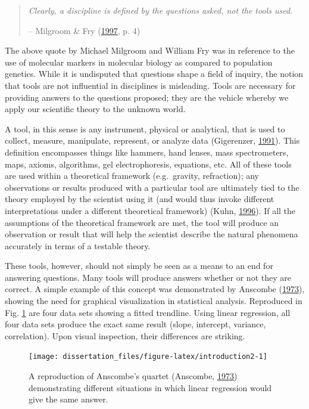 \documentclass[double,11pt]{beavtex}
\begin{document}
  \begin{quote}
  \emph{Clearly, a discipline is defined by the questions asked, not the
  tools used.}
  
  -- Milgroom \& Fry
  (\protect\hyperlink{ref-milgroom1997contributions}{1997}, p. 4)
  \end{quote}
  
  The above quote by Michael Milgroom and William Fry was in reference to
  the use of molecular markers in molecular biology as compared to
  population genetics. While it is undisputed that questions shape a field
  of inquiry, the notion that tools are not influential in disciplines is
  misleading. Tools are necessary for providing answers to the questions
  proposed; they are the vehicle whereby we apply our scientific theory to
  the unknown world.
  
  A tool, in this sense is any instrument, physical or analytical, that is
  used to collect, measure, manipulate, represent, or analyze data
  (Gigerenzer, \protect\hyperlink{ref-gigerenzer1991tools}{1991}). This
  definition encompasses things like hammers, hand lenses, mass
  spectrometers, maps, axioms, algorithms, gel electrophoresis, equations,
  etc. All of these tools are used within a theoretical framework
  (e.g.~gravity, refraction); any observations or results produced with a
  particular tool are ultimately tied to the theory employed by the
  scientist using it (and would thus invoke different interpretations
  under a different theoretical framework) (Kuhn,
  \protect\hyperlink{ref-kuhn1996structure}{1996}). If all the assumptions
  of the theoretical framework are met, the tool will produce an
  observation or result that will help the scientist describe the natural
  phenomena accurately in terms of a testable theory.
  
  These tools, however, should not simply be seen as a means to an end for
  answering questions. Many tools will produce answers whether or not they
  are correct. A simple example of this concept was demonstrated by
  Anscombe (\protect\hyperlink{ref-anscombe1973graphs}{1973}), showing the
  need for graphical visualization in statistical analysis. Reproduced in
  Fig. \ref{fig:introduction2} are four data sets showing a fitted
  trendline. Using linear regression, all four data sets produce the exact
  same result (slope, intercept, variance, correlation). Upon visual
  inspection, their differences are striking.
  
  \begin{figure}
  
  {\centering \texttt{[image: dissertation\_files/figure-latex/introduction2-1]} 
  
  }
  
  \caption[A reproduction of 'Anscombe's quartet']{A reproduction of Anscombe's quartet (Anscombe,
  \protect\hyperlink{ref-anscombe1973graphs}{1973}) demonstrating
  different situations in which linear regression would give the same
  answer.}\label{fig:introduction2}
  \end{figure}
  
\end{document}
